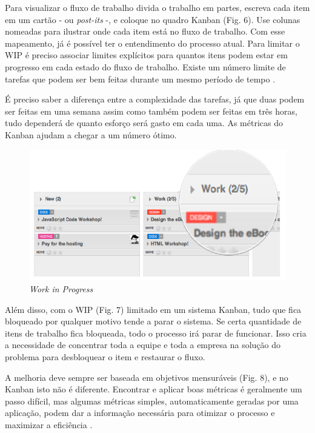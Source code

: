 Para visualizar o fluxo de trabalho divida o trabalho em partes, escreva cada item em um cartão - ou \textit{post-its} -, e coloque no quadro Kanban (Fig. 6). Use colunas nomeadas para ilustrar onde cada item está no fluxo de trabalho. Com esse mapeamento, já é possível ter o entendimento do processo atual. 
Para limitar o WIP é preciso associar limites explícitos para quantos itens podem estar em progresso em cada estado do fluxo de trabalho. Existe um número limite de tarefas que podem ser bem feitas durante um mesmo período de tempo \cite{klipp}. 

É preciso saber a diferença entre a complexidade das tarefas, já que duas podem ser feitas em uma semana assim como também podem ser feitas em três horas, tudo dependerá de quanto esforço será gasto em cada uma. As métricas do Kanban ajudam a chegar a um número ótimo.

\begin{figure}[H]
		\centering
		\label{fig05}
			\includegraphics[scale=0.5]{figuras/WIP.png}
		\caption{\textit{Work in Progress}  \cite{klipp}}
\end{figure}


Além disso, com o WIP (Fig. 7) limitado em um sistema Kanban, tudo que fica bloqueado por qualquer motivo tende a parar o sistema. Se certa quantidade de itens de trabalho fica bloqueada, todo o processo irá parar de funcionar. Isso cria a necessidade de concentrar toda a equipe e toda a empresa na solução do problema para desbloquear o item e restaurar o fluxo. 

A melhoria deve sempre ser baseada em objetivos mensuráveis (Fig. 8), e no Kanban isto não é diferente. Encontrar e aplicar boas métricas é geralmente um passo difícil, mas algumas métricas simples, automaticamente geradas por uma aplicação, podem dar a informação necessária para otimizar o processo e maximizar a eficiência \cite{klipp}. 

